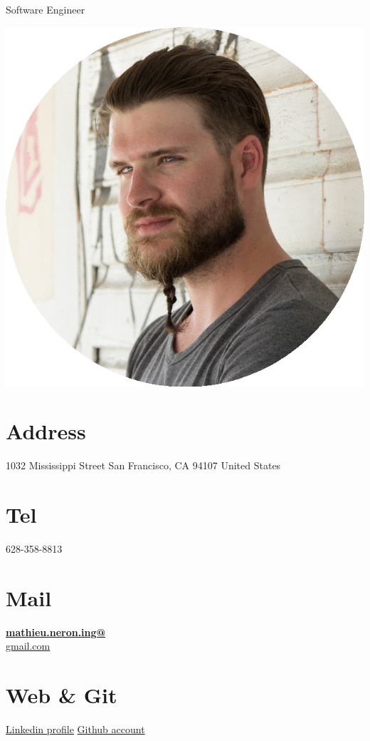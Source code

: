 \documentclass[]{friggeri-cv}
\begin{document}
      {Software Engineer}
      

\begin{aside}
  \includegraphics[scale=0.18]{img/mathieu.png}
  \section{Address}
    1032 Mississippi Street
    San Francisco, CA
    94107
    United States
    ~
  \section{Tel}
    628-358-8813
    ~
  \section{Mail}
    \href{mailto:mathieu.neron.ing@gmail.com}{\textbf{mathieu.neron.ing@}\\gmail.com}
    ~
  \section{Web \& Git}
    \href{https://ca.linkedin.com/in/mathieu-n\%C3\%A9ron-b4419522}{Linkedin profile}
\href{https://github.com/mathieu-neron}{Github account}
    ~

\end{aside}
\end{document}
